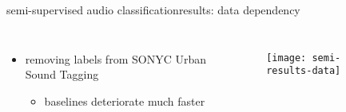 \begin{frame}{semi-supervised audio classification}{results: data dependency}
    \begin{columns}
            \begin{itemize}
                \item   removing labels from SONYC Urban Sound Tagging
                    \begin{itemize}
                        \item baselines deteriorate much faster
                    \end{itemize}
            \end{itemize}
            \begin{figure}%
                \texttt{[image: semi-results-data]}%
            \end{figure}
    \end{columns}
\end{frame}
